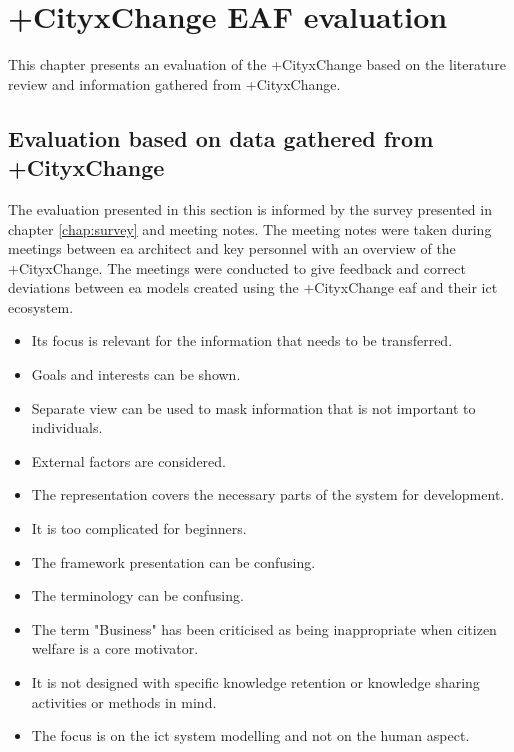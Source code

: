 \chapter{+CityxChange EAF evaluation}
This chapter presents an evaluation of the +CityxChange based on the literature review and information gathered from +CityxChange. 

\section{Evaluation based on data gathered from +CityxChange}
The evaluation presented in this section is informed by the survey presented in chapter \ref{chap:survey} and meeting notes. The meeting notes were taken during meetings between \gls{ea} architect and key personnel with an overview of the +CityxChange. The meetings were conducted to give feedback and correct deviations between \gls{ea} models created using the +CityxChange \gls{eaf} and their \gls{ict ecosystem}. 

\begin{itemize}[label=+]
    \item Its focus is relevant for the information that needs to be transferred.
    \item Goals and interests can be shown.
    \item Separate view can be used to mask information that is not important to individuals.
    \item External factors are considered.
    \item The representation covers the necessary parts of the system for development. 
\end{itemize}
\begin{itemize}[label=-]
    \item It is too complicated for beginners.
    \item The framework presentation can be confusing.
    \item The terminology can be confusing.
    \item The term "Business" has been criticised as being inappropriate when citizen welfare is a core motivator. 
    \item It is not designed with specific knowledge retention or knowledge sharing activities or methods in mind. 
    \item The focus is on the \gls{ict} system modelling and not on the human aspect.
\end{itemize}

